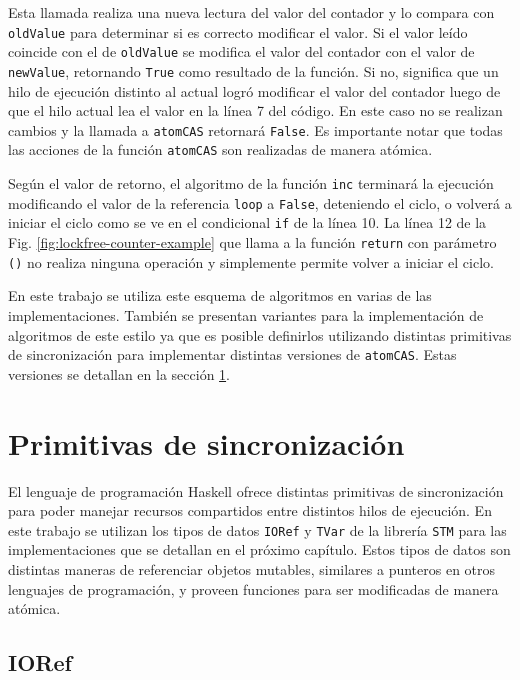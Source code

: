 Esta llamada realiza una nueva lectura del valor del contador y lo compara con \texttt{oldValue} para determinar si es correcto modificar el valor.
Si el valor leído coincide con el de \texttt{oldValue} se modifica el valor del contador con el valor de \texttt{newValue}, retornando \texttt{True} como resultado de la función.
Si no, significa que un hilo de ejecución distinto al actual logró modificar el valor del contador luego de que el hilo actual lea el valor en la línea 7 del código.
En este caso no se realizan cambios y la llamada a \texttt{atomCAS} retornará \texttt{False}.
Es importante notar que todas las acciones de la función \texttt{atomCAS} son realizadas de manera atómica.

Según el valor de retorno, el algoritmo de la función \texttt{inc} terminará la ejecución modificando el valor de la referencia \texttt{loop} a \texttt{False}, deteniendo el ciclo, o volverá a iniciar el ciclo como se ve en el condicional \texttt{if} de la línea 10.
La línea 12 de la Fig. \ref{fig:lockfree-counter-example} que llama a la función \texttt{return} con parámetro \texttt{()} no realiza ninguna operación y simplemente permite volver a iniciar el ciclo.

En este trabajo se utiliza este esquema de algoritmos en varias de las implementaciones. También se presentan variantes para la implementación de algoritmos de este estilo ya que es posible definirlos utilizando distintas primitivas de sincronización para implementar distintas versiones de \texttt{atomCAS}.
Estas versiones se detallan en la sección \ref{sec:primitives}.

\section{Primitivas de sincronización} \label{sec:primitives}
El lenguaje de programación Haskell ofrece distintas primitivas de sincronización para poder manejar recursos compartidos entre distintos hilos de ejecución.
En este trabajo se utilizan los tipos de datos \texttt{IORef} y \texttt{TVar} de la librería \texttt{STM} para las implementaciones que se detallan en el próximo capítulo.
Estos tipos de datos son distintas maneras de referenciar objetos mutables, similares a punteros en otros lenguajes de programación, y proveen funciones para ser modificadas de manera atómica.

\subsection{IORef}\label{sub:ioref}

